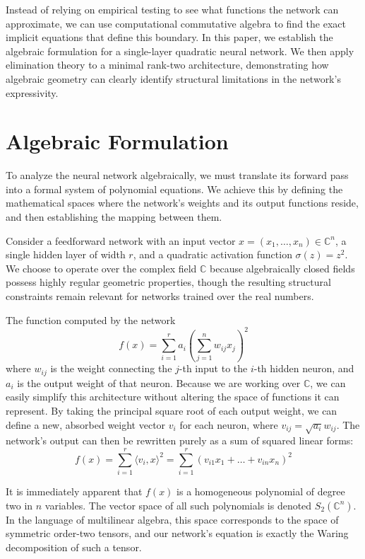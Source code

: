 Instead of relying on empirical testing to see what functions the network can approximate, we can use computational commutative algebra to find the exact implicit equations that define this boundary. In this paper, we establish the algebraic formulation for a single-layer quadratic neural network. We then apply elimination theory \cite{cox2015IVA} to a minimal rank-two architecture, demonstrating how algebraic geometry can clearly identify structural limitations in the network's expressivity.

\section{Algebraic Formulation}

To analyze the neural network algebraically, we must translate its forward pass into a formal system of polynomial equations. We achieve this by defining the mathematical spaces where the network's weights and its output functions reside, and then establishing the mapping between them. 

Consider a feedforward network with an input vector $x = (x_1, \dots, x_n) \in \mathbb{C}^n$, a single hidden layer of width $r$, and a quadratic activation function $\sigma(z) = z^2$. We choose to operate over the complex field $\mathbb{C}$ because algebraically closed fields possess highly regular geometric properties, though the resulting structural constraints remain relevant for networks trained over the real numbers. 

The function computed by the network
\[
f(x) = \sum_{i=1}^r a_i \left( \sum_{j=1}^n w_{ij} x_j \right)^2
\]
where $w_{ij}$ is the weight connecting the $j$-th input to the $i$-th hidden neuron, and $a_i$ is the output weight of that neuron. Because we are working over $\mathbb{C}$, we can easily simplify this architecture without altering the space of functions it can represent. By taking the principal square root of each output weight, we can define a new, absorbed weight vector $v_i$ for each neuron, where $v_{ij} = \sqrt{a_i} w_{ij}$. The network's output can then be rewritten purely as a sum of squared linear forms:
\[
f(x) = \sum_{i=1}^r \langle v_i, x \rangle^2 = \sum_{i=1}^r \left( v_{i1}x_1 + \dots + v_{in}x_n \right)^2
\]

It is immediately apparent that $f(x)$ is a homogeneous polynomial of degree two in $n$ variables. The vector space of all such polynomials is denoted $S_2(\mathbb{C}^n)$. In the language of multilinear algebra, this space corresponds to the space of symmetric order-two tensors, and our network's equation is exactly the Waring decomposition of such a tensor. 


